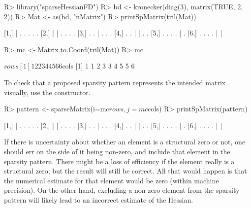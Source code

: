 \documentclass[jss]{jss}\usepackage[]{graphicx}\usepackage[]{color}
\newcommand{\func}[1]{\code{#1}}
\begin{document}
\begin{minipage}{\columnwidth}
\begin{Schunk}
\begin{Sinput}
R> library("sparseHessianFD")
R> bd <- kronecker(diag(3), matrix(TRUE, 2, 2))
R> Mat <- as(bd, "nMatrix")
R> printSpMatrix(tril(Mat))
\end{Sinput}
\begin{Soutput}
                
[1,] | . . . . .
[2,] | | . . . .
[3,] . . | . . .
[4,] . . | | . .
[5,] . . . . | .
[6,] . . . . | |
\end{Soutput}
\begin{Sinput}
R> mc <- Matrix.to.Coord(tril(Mat))
R> mc
\end{Sinput}
\begin{Soutput}
$rows
[1] 1 2 2 3 4 4 5 6 6

$cols
[1] 1 1 2 3 3 4 5 5 6
\end{Soutput}
\end{Schunk}
\end{minipage}

\vspace{1em}
To check that a proposed sparsity pattern represents the
intended matrix visually, use the  \func{sparseMatrix} constructor.

\begin{Schunk}
\begin{Sinput}
R> pattern <- sparseMatrix(i=mc$rows, j=mc$cols)
R> printSpMatrix(pattern)
\end{Sinput}
\begin{Soutput}
                
[1,] | . . . . .
[2,] | | . . . .
[3,] . . | . . .
[4,] . . | | . .
[5,] . . . . | .
[6,] . . . . | |
\end{Soutput}
\end{Schunk}

If there is uncertainty about whether an element is a structural
   zero or not, one should err on the side of it being non-zero, and
   include that element in the sparsity pattern.
   There might be a loss of efficiency if the element really is a
   structural zero, but the result will still be correct.  All that
   would happen is that the numerical estimate for that element would be zero
   (within machine precision). On the other hand, excluding a non-zero
   element from the sparsity pattern will likely lead to an incorrect
   estimate of the Hessian.
\end{document}
